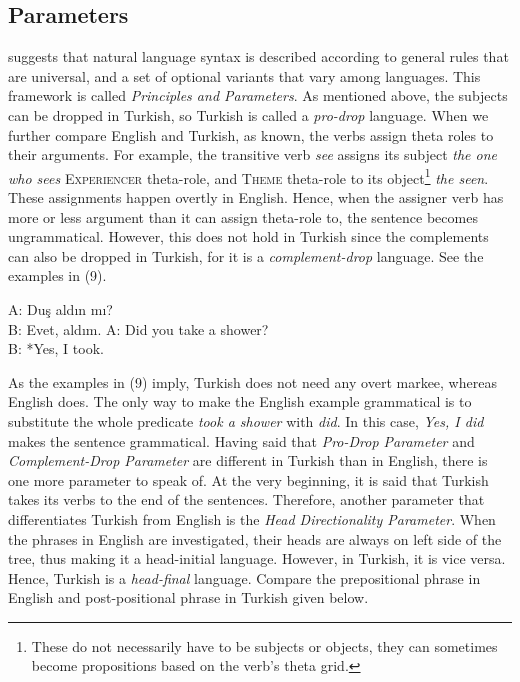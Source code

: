 \documentclass[11pt,a4paper]{article}
\begin{document}
\subsection{Parameters}
\textcite{minimalist} suggests that natural language syntax is described according to general rules that are universal, and a set of optional variants that vary among languages. This framework is called \emph{Principles and Parameters}. As mentioned above, the subjects can be dropped in Turkish, so Turkish is called a \emph{pro-drop} language. When we further compare English and Turkish, as known, the verbs assign theta roles to their arguments. For example, the transitive verb \emph{see} assigns its subject \emph{the one who sees} \textsc{Experiencer} theta-role, and \textsc{Theme} theta-role to its object\footnote{These do not necessarily have to be subjects or objects, they can sometimes become propositions based on the verb's theta grid.} \emph{the seen}. These assignments happen overtly in English. Hence, when the assigner verb has more or less argument than it can assign theta-role to, the sentence becomes ungrammatical. However, this does not hold in Turkish since the complements can also be dropped in Turkish, for it is a \emph{complement-drop} language. See the examples in (9).
\begin{exe}
		\ex
			\begin{xlist}
				\ex A: Duş aldın mı?\\
				B: Evet, aldım.
				\ex A: Did you take a shower?\\
				B: *Yes, I took.
			\end{xlist}
	\end{exe}
As the examples in (9) imply, Turkish does not need any overt markee, whereas English does. The only way to make the English example grammatical is to substitute the whole predicate \emph{took a shower} with \emph{did}. In this case, \emph{Yes, I did} makes the sentence grammatical. Having said that \emph{Pro-Drop Parameter} and \emph{Complement-Drop Parameter} are different in Turkish than in English, there is one more parameter to speak of. At the very beginning, it is said that Turkish takes its verbs to the end of the sentences. Therefore, another parameter that differentiates Turkish from English is the \emph{Head Directionality Parameter}. When the phrases in English are investigated, their heads are always on left side of the tree, thus making it a head-initial language. However, in Turkish, it is vice versa. Hence, Turkish is a \emph{head-final} language. Compare the prepositional phrase in English and post-positional phrase in Turkish given below.\\
\end{document}
